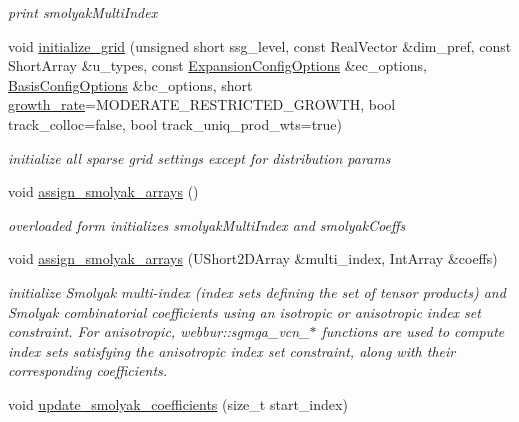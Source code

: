 \begin{DoxyCompactItemize}
\begin{DoxyCompactList}\small\item\em print smolyak\+Multi\+Index \end{DoxyCompactList}\item 
void \hyperlink{classPecos_1_1CombinedSparseGridDriver_a84e051bd519c215c99c164f6a024171e}{initialize\+\_\+grid} (unsigned short ssg\+\_\+level, const Real\+Vector \&dim\+\_\+pref, const Short\+Array \&u\+\_\+types, const \hyperlink{classPecos_1_1ExpansionConfigOptions}{Expansion\+Config\+Options} \&ec\+\_\+options, \hyperlink{classPecos_1_1BasisConfigOptions}{Basis\+Config\+Options} \&bc\+\_\+options, short \hyperlink{classPecos_1_1SparseGridDriver_a6f9061513ba25c62ee7a49b0d5da42cc}{growth\+\_\+rate}=M\+O\+D\+E\+R\+A\+T\+E\+\_\+\+R\+E\+S\+T\+R\+I\+C\+T\+E\+D\+\_\+\+G\+R\+O\+W\+TH, bool track\+\_\+colloc=false, bool track\+\_\+uniq\+\_\+prod\+\_\+wts=true)\label{classPecos_1_1CombinedSparseGridDriver_a84e051bd519c215c99c164f6a024171e}

\begin{DoxyCompactList}\small\item\em initialize all sparse grid settings except for distribution params \end{DoxyCompactList}\item 
void \hyperlink{classPecos_1_1CombinedSparseGridDriver_a4ad5b25d8f7fff7f15a18e45666a3c9c}{assign\+\_\+smolyak\+\_\+arrays} ()\label{classPecos_1_1CombinedSparseGridDriver_a4ad5b25d8f7fff7f15a18e45666a3c9c}

\begin{DoxyCompactList}\small\item\em overloaded form initializes smolyak\+Multi\+Index and smolyak\+Coeffs \end{DoxyCompactList}\item 
void \hyperlink{classPecos_1_1CombinedSparseGridDriver_a2feef60ddf8417a976c8d98a78f8644d}{assign\+\_\+smolyak\+\_\+arrays} (U\+Short2\+D\+Array \&multi\+\_\+index, Int\+Array \&coeffs)\label{classPecos_1_1CombinedSparseGridDriver_a2feef60ddf8417a976c8d98a78f8644d}

\begin{DoxyCompactList}\small\item\em initialize Smolyak multi-\/index (index sets defining the set of tensor products) and Smolyak combinatorial coefficients using an isotropic or anisotropic index set constraint. For anisotropic, webbur\+::sgmga\+\_\+vcn\+\_\+$\ast$ functions are used to compute index sets satisfying the anisotropic index set constraint, along with their corresponding coefficients. \end{DoxyCompactList}\item 
void \hyperlink{classPecos_1_1CombinedSparseGridDriver_ab185944e4f8d69104f77ed055f9d49f8}{update\+\_\+smolyak\+\_\+coefficients} (size\+\_\+t start\+\_\+index)\label{classPecos_1_1CombinedSparseGridDriver_ab185944e4f8d69104f77ed055f9d49f8}


\end{DoxyCompactItemize}
